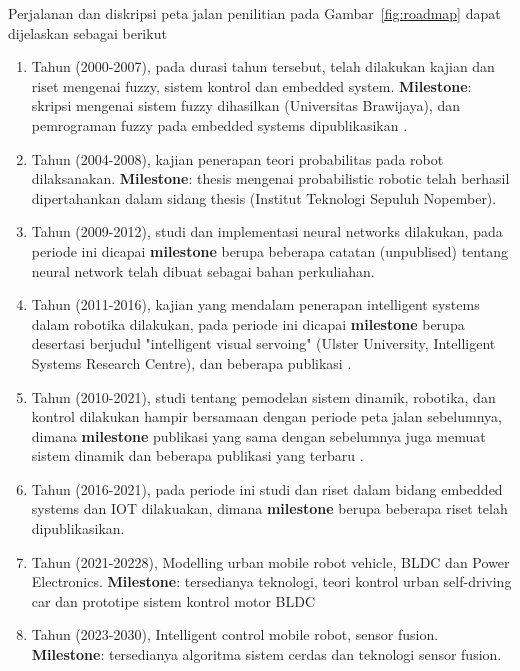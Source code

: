 Perjalanan dan diskripsi peta jalan penilitian pada Gambar~\ref{fig:roadmap} dapat dijelaskan sebagai berikut
\begin{enumerate}
\item Tahun (2000-2007), pada durasi tahun tersebut, telah dilakukan kajian dan riset mengenai fuzzy, sistem kontrol dan embedded system. \textbf{Milestone}: skripsi mengenai sistem fuzzy dihasilkan (Universitas Brawijaya), dan pemrograman fuzzy pada embedded systems dipublikasikan \cite{indrazno2007}.
\item Tahun (2004-2008), kajian penerapan teori probabilitas pada robot dilaksanakan. \textbf{Milestone}: thesis mengenai probabilistic robotic telah berhasil dipertahankan dalam sidang thesis (Institut Teknologi Sepuluh Nopember).
\item Tahun (2009-2012), studi dan implementasi neural networks dilakukan, pada periode ini dicapai \textbf{milestone} berupa beberapa catatan (unpublised) tentang neural network telah dibuat sebagai bahan perkuliahan.
\item Tahun (2011-2016), kajian yang mendalam penerapan intelligent systems dalam robotika dilakukan, pada periode ini dicapai \textbf{milestone} berupa desertasi berjudul "intelligent visual servoing" (Ulster University, Intelligent Systems Research Centre), dan beberapa publikasi \cite{indrazno2009, indrazno2010, indrazno2011, indrazno2012, yiannis2012, indrazno2014}.
\item Tahun (2010-2021), studi tentang pemodelan sistem dinamik, robotika, dan kontrol dilakukan hampir bersamaan dengan periode peta jalan sebelumnya, dimana \textbf{milestone} publikasi yang sama dengan sebelumnya juga memuat sistem dinamik dan beberapa publikasi yang terbaru \cite{indrazno2015, indrazno2017a, indrazno2017b, indrazno2017c, indrazno2018a, indrazno2018d, indrazno2018e, ferdian2019a, ferdian2019b, widamuri2020, indrazno2021a, indrazno2021b, indrazno2021c}.
\item Tahun (2016-2021), pada periode ini studi dan riset dalam bidang embedded systems dan IOT dilakuakan, dimana \textbf{milestone} berupa beberapa riset \cite{indrazno2015, indrazno2018b, indrazno2018c, erfan2018a, rosa2018, rosa2020} telah dipublikasikan.
\item Tahun (2021-20228), Modelling urban mobile robot vehicle, BLDC dan Power Electronics. \textbf{Milestone}: tersedianya teknologi, teori kontrol urban self-driving car dan prototipe sistem kontrol motor BLDC
\item Tahun (2023-2030), Intelligent control mobile robot, sensor fusion. \textbf{Milestone}: tersedianya algoritma sistem cerdas dan teknologi sensor fusion.
\end{enumerate}
